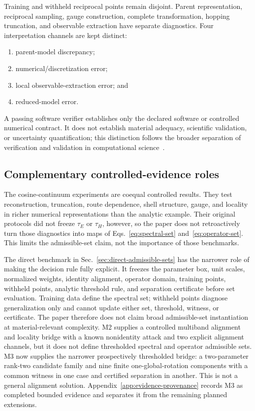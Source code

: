 \documentclass[preprint,12pt]{elsarticle}
\begin{document}
Training and withheld reciprocal points remain disjoint. Parent
representation, reciprocal sampling, gauge construction, complete
transformation, hopping truncation, and observable extraction have separate
diagnostics. Four interpretation channels are kept distinct:
\begin{enumerate}
 \item parent-model discrepancy;
 \item numerical/discretization error;
 \item local observable-extraction error; and
 \item reduced-model error.
\end{enumerate}
A passing software verifier establishes only the declared software or
controlled numerical contract. It does not establish material adequacy,
scientific validation, or uncertainty quantification; this distinction follows
the broader separation of verification and validation in computational
science~\cite{roache1998}.

\subsection{Complementary controlled-evidence roles}
\label{sec:framework-instantiation}

The cosine-continuum experiments are coequal controlled results. They test
reconstruction, truncation, route dependence, shell structure, gauge, and
locality in richer numerical representations than the analytic example. Their
original protocols did not freeze $\tau_E$ or $\tau_H$, however, so the paper
does not retroactively turn those diagnostics into maps of
Eqs.~\eqref{eq:spectral-set} and~\eqref{eq:operator-set}. This limits the
admissible-set claim, not the importance of those benchmarks.

The direct benchmark in Sec.~\ref{sec:direct-admissible-sets} has the narrower
role of making the decision rule fully explicit. It freezes the parameter box,
unit scales, normalized weights, identity alignment, operator domain, training
points, withheld points, analytic threshold rule, and separation certificate
before set evaluation. Training data define the spectral set; withheld points
diagnose generalization only and cannot update either set, threshold, witness,
or certificate. The paper therefore does not claim broad admissible-set
instantiation at material-relevant complexity. M2 supplies a controlled
multiband alignment and locality bridge with a known nonidentity attack and two
explicit alignment channels, but it does not define thresholded spectral and
operator admissible sets. M3 now supplies the narrower prospectively
thresholded bridge: a two-parameter rank-two candidate family and nine finite
one-global-rotation components with a common witness in one case and certified
separation in another. This is not a general alignment solution.
Appendix~\ref{app:evidence-provenance} records M3 as completed bounded evidence
and separates it from the remaining planned extensions.
\end{document}
